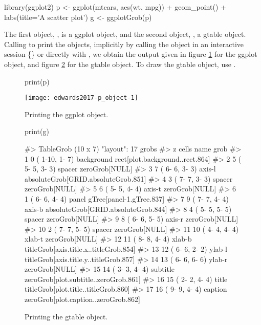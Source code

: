 \begin{Sinput}
library(ggplot2)
p <- ggplot(mtcars, aes(wt, mpg)) + geom_point() + labs(title='A scatter plot')
g <- ggplotGrob(p)
\end{Sinput}


The first object, , is a ggplot object, and the second object,
, a gtable object. Calling to print the objects, implicitly by
calling the object in an interactive session \{\R\} or directly with
, we obtain the output given in figure \ref{fig:p_object}
for the ggplot object, and figure \ref{fig:g_object} for the gtable
object. To draw the gtable object, use .

\begin{figure}[h!]

\begin{Sinput}
print(p)
\end{Sinput}

\texttt{[image: edwards2017-p\_object-1]} 
\caption{Printing the ggplot object.}
\label{fig:p_object}
\end{figure}

\begin{figure}[h!]

\begin{Sinput}
print(g)
\end{Sinput}
\begin{Soutput}
#> TableGrob (10 x 7) "layout": 17 grobs
#>     z         cells       name                                   grob
#> 1   0 ( 1-10, 1- 7) background        rect[plot.background..rect.864]
#> 2   5 ( 5- 5, 3- 3)     spacer                         zeroGrob[NULL]
#> 3   7 ( 6- 6, 3- 3)     axis-l    absoluteGrob[GRID.absoluteGrob.851]
#> 4   3 ( 7- 7, 3- 3)     spacer                         zeroGrob[NULL]
#> 5   6 ( 5- 5, 4- 4)     axis-t                         zeroGrob[NULL]
#> 6   1 ( 6- 6, 4- 4)      panel               gTree[panel-1.gTree.837]
#> 7   9 ( 7- 7, 4- 4)     axis-b    absoluteGrob[GRID.absoluteGrob.844]
#> 8   4 ( 5- 5, 5- 5)     spacer                         zeroGrob[NULL]
#> 9   8 ( 6- 6, 5- 5)     axis-r                         zeroGrob[NULL]
#> 10  2 ( 7- 7, 5- 5)     spacer                         zeroGrob[NULL]
#> 11 10 ( 4- 4, 4- 4)     xlab-t                         zeroGrob[NULL]
#> 12 11 ( 8- 8, 4- 4)     xlab-b titleGrob[axis.title.x..titleGrob.854]
#> 13 12 ( 6- 6, 2- 2)     ylab-l titleGrob[axis.title.y..titleGrob.857]
#> 14 13 ( 6- 6, 6- 6)     ylab-r                         zeroGrob[NULL]
#> 15 14 ( 3- 3, 4- 4)   subtitle  zeroGrob[plot.subtitle..zeroGrob.861]
#> 16 15 ( 2- 2, 4- 4)      title   titleGrob[plot.title..titleGrob.860]
#> 17 16 ( 9- 9, 4- 4)    caption   zeroGrob[plot.caption..zeroGrob.862]
\end{Soutput}

  \caption{Printing the gtable object.}
  \label{fig:g_object}
\end{figure}

